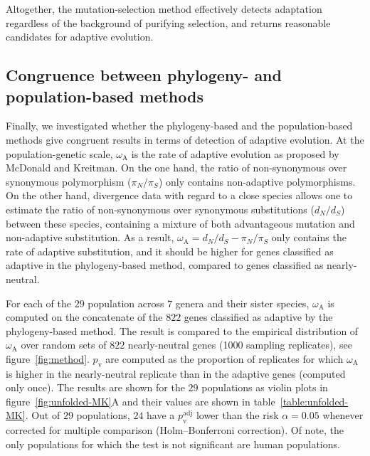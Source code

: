 \documentclass{article}
\newcommand{\dn}{d_N}
\newcommand{\ds}{d_S}
\newcommand{\dnds}{\dn / \ds}
\newcommand{\pn}{\pi_N}
\newcommand{\ps}{\pi_S}
\newcommand{\pnps}{\pn / \ps}
\begin{document}
    Altogether, the mutation-selection method effectively detects adaptation regardless of the background of purifying selection, and returns reasonable candidates for adaptive evolution.

    \subsection*{Congruence between phylogeny- and population-based methods}

    Finally, we investigated whether the phylogeny-based and the population-based methods give congruent results in terms of detection of adaptive evolution.
    At the population-genetic scale, $\omega_{\mathrm{A}}$ is the rate of adaptive evolution as proposed by McDonald and Kreitman\cite{mcdonald_adaptative_1991}.
    On the one hand, the ratio of non-synonymous over synonymous polymorphism ($\pnps$) only contains non-adaptive polymorphisms.
    On the other hand, divergence data with regard to a close species allows one to estimate the ratio of non-synonymous over synonymous substitutions ($\dnds$) between these species, containing a mixture of both advantageous mutation and non-adaptive substitution.
    As a result, $\omega_{\mathrm{A}} = \dnds - \pnps$ only contains the rate of adaptive substitution, and it should be higher for genes classified as adaptive in the phylogeny-based method, compared to genes classified as nearly-neutral.

    For each of the $29$ population across $7$ genera and their sister species, $\omega_{\mathrm{A}}$ is computed on the concatenate of the $822$ genes classified as adaptive by the phylogeny-based method.
    The result is compared to the empirical distribution of $\omega_{\mathrm{A}}$ over random sets of $822$ nearly-neutral genes (1000 sampling replicates), see figure~\ref{fig:method}.
    $p_{\mathrm{v}}$ are computed as the proportion of replicates for which $\omega_{\mathrm{A}}$ is higher in the nearly-neutral replicate than in the adaptive genes (computed only once).
    The results are shown for the $29$ populations as violin plots in figure~\ref{fig:unfolded-MK}A and their values are shown in table~\ref{table:unfolded-MK}.
    Out of $29$ populations, $24$ have a $p_{\mathrm{v}}^{\mathrm{adj}}$ lower than the risk $\alpha=0.05$ whenever corrected for multiple comparison (Holm–Bonferroni correction).
    Of note, the only populations for which the test is not significant are human populations.
\end{document}
